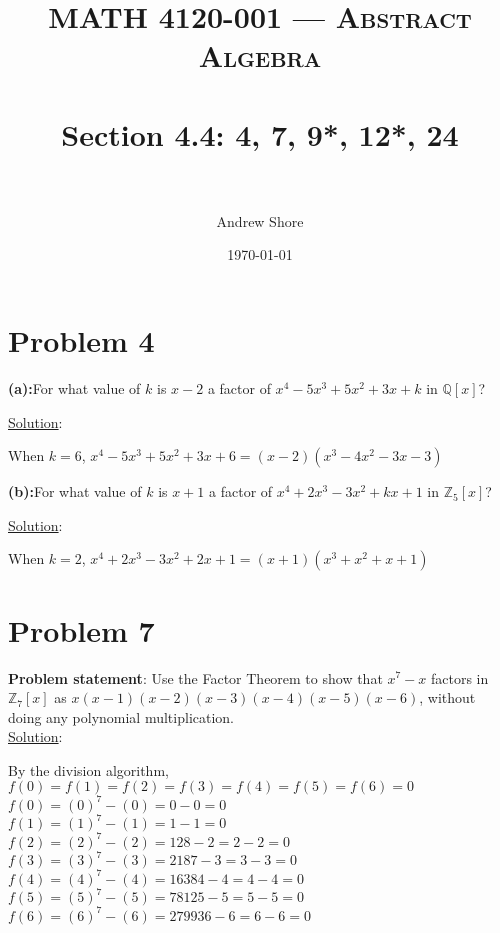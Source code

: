 \documentclass{article} %
\title{ 
\normalfont \normalsize 
\textsc{MATH 4120-001 --- Abstract Algebra} \\
\horrule{0.5pt} \\[0cm] %
\huge Section 4.4: 4, 7, 9*, 12*, 24 \\ %
\horrule{2pt} \\[0cm] %
}
\author{Andrew Shore} %
\date{\normalsize\today} %
\begin{document}
\maketitle %

\section*{Problem 4}


\textbf{(a):}For what value of $k$ is $x-2$ a factor of $x^4 - 5x^3 + 5x^2 + 3x + k$ in $\mathbb{Q}[x]$? 
\begin{addmargin}[1em]{0em}
\underline{Solution}: 
\begin{addmargin}[1em]{0em}
When $k = 6$, $x^4 - 5x^3 + 5x^2 + 3x + 6 = (x-2)(x^3 - 4x^2 - 3x - 3)$
\end{addmargin}
\end{addmargin}    


\textbf{(b):}For what value of $k$ is $x+1$ a factor of $x^4 + 2x^3 - 3x^2 + kx + 1$ in $\mathbb{Z}_5[x]$? 
\begin{addmargin}[1em]{0em}
\underline{Solution}: 
\begin{addmargin}[1em]{0em}
When $k = 2$, $x^4 + 2x^3 - 3x^2 + 2x + 1 = (x + 1)(x^3 + x^2 + x + 1)$
\end{addmargin}
\end{addmargin}    
\newpage

\section*{Problem 7}

\textbf{Problem statement}: Use the Factor Theorem to show that $x^7 - x$ factors in $\mathbb{Z}_7[x]$ as $x(x-1)(x-2)(x-3)(x-4)(x-5)(x-6)$, without doing any polynomial multiplication.
\\

\underline{Solution}: 
\begin{addmargin}[1em]{0em}
By the division algorithm, $f(0) = f(1) = f(2) = f(3) = f(4) = f(5) = f(6) = 0$
\\$f(0) = (0)^ 7 - (0) = 0 - 0 = 0$
\\$f(1) = (1)^7 - (1) = 1 - 1 = 0$
\\$f(2) = (2)^7 - (2) = 128 - 2 = 2 - 2 = 0$
\\$f(3) = (3)^7 - (3) = 2187 - 3 = 3 - 3 = 0$
\\$f(4) = (4)^7 - (4) = 16384 - 4 = 4 - 4 = 0$
\\$f(5) = (5)^7 - (5) = 78125 - 5 = 5 - 5 = 0$
\\$f(6) = (6)^7 - (6) = 279936 - 6 = 6 - 6 = 0$
\end{addmargin}
\end{document}
